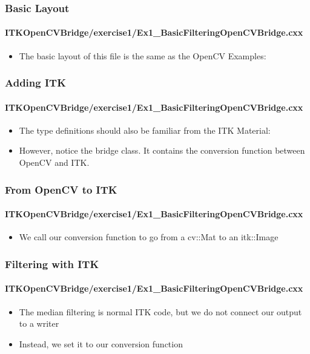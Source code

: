 \begin{frame}
\frametitle{Basic Layout}
\framesubtitle{ITKOpenCVBridge/exercise1/Ex1\_BasicFilteringOpenCVBridge.cxx}
\begin{itemize}
\item The basic layout of this file is the same as the OpenCV
  Examples:
\end{itemize}
\end{frame}

\begin{frame}
\frametitle{Adding ITK}
\framesubtitle{ITKOpenCVBridge/exercise1/Ex1\_BasicFilteringOpenCVBridge.cxx}
\begin{itemize}
\item The type definitions should also be familiar from the ITK Material:

\item However, notice the bridge class. It contains the conversion function
between OpenCV and ITK.
\end{itemize}
\end{frame}

\begin{frame}
\frametitle{From OpenCV to ITK}
\framesubtitle{ITKOpenCVBridge/exercise1/Ex1\_BasicFilteringOpenCVBridge.cxx}
\begin{itemize}
\item We call our conversion function to go from a cv::Mat to an
  itk::Image
\end{itemize}
\end{frame}

\begin{frame}
\frametitle{Filtering with ITK}
\framesubtitle{ITKOpenCVBridge/exercise1/Ex1\_BasicFilteringOpenCVBridge.cxx}
\begin{itemize}
\item The median filtering is normal ITK code, but we do not connect our
output to a writer
\pause
\item Instead, we set it to our conversion function
\end{itemize}
\end{frame}

